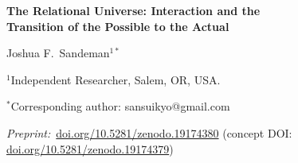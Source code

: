 \documentclass[11pt,a4paper]{article}
\theoremstyle{plain}
\theoremstyle{definition}
\theoremstyle{remark}
\begin{document}
\begin{center}
  {\LARGE\bfseries The Relational Universe: Interaction and the\\[4pt]
   Transition of the Possible to the Actual\par}
  \vspace{10pt}
  {\large Joshua F.\ Sandeman$^{1*}$\par}
  \vspace{4pt}
  {\normalsize $^{1}$Independent Researcher, Salem, OR, USA.\par}
  {\normalsize $^{*}$Corresponding author: sansuikyo@gmail.com\par}
  \vspace{8pt}
  {\small\textit{Preprint:}~\href{https://doi.org/10.5281/zenodo.19174380}{doi.org/10.5281/zenodo.19174380}
  (concept DOI: \href{https://doi.org/10.5281/zenodo.19174379}{doi.org/10.5281/zenodo.19174379})\par}
  \vspace{14pt}
\end{center}
\end{document}
